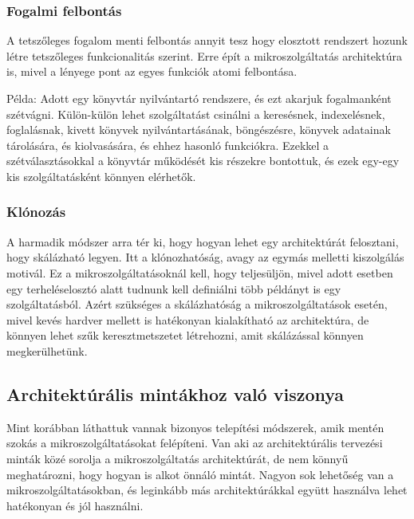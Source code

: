 \documentclass[11pt,magyar,a4paper,twoside,]{report}
\begin{document}
\subsubsection{Fogalmi felbontás}\label{fogalmi-felbontuxe1s}

A tetszőleges fogalom menti felbontás annyit tesz hogy elosztott
rendszert hozunk létre tetszőleges funkcionalitás szerint. Erre épít a
mikroszolgáltatás architektúra is, mivel a lényege pont az egyes
funkciók atomi felbontása.

Példa: Adott egy könyvtár nyilvántartó rendszere, és ezt akarjuk
fogalmanként szétvágni. Külön-külön lehet szolgáltatást csinálni a
keresésnek, indexelésnek, foglalásnak, kivett könyvek nyilvántartásának,
böngészésre, könyvek adatainak tárolására, és kiolvasására, és ehhez
hasonló funkciókra. Ezekkel a szétválasztásokkal a könyvtár működését
kis részekre bontottuk, és ezek egy-egy kis szolgáltatásként könnyen
elérhetők.

\subsubsection{Klónozás}\label{kluxf3nozuxe1s}

A harmadik módszer arra tér ki, hogy hogyan lehet egy architektúrát
felosztani, hogy skálázható legyen. Itt a klónozhatóság, avagy az egymás
melletti kiszolgálás motivál. Ez a mikroszolgáltatásoknál kell, hogy
teljesüljön, mivel adott esetben egy terheléselosztó alatt tudnunk kell
definiálni több példányt is egy szolgáltatásból. Azért szükséges a
skálázhatóság a mikroszolgáltatások esetén, mivel kevés hardver mellett
is hatékonyan kialakítható az architektúra, de könnyen lehet szűk
keresztmetszetet létrehozni, amit skálázással könnyen megkerülhetünk.

\subsection{Architektúrális mintákhoz való
viszonya}\label{architektuxfaruxe1lis-mintuxe1khoz-valuxf3-viszonya}

Mint korábban láthattuk vannak bizonyos telepítési módszerek, amik
mentén szokás a mikroszolgáltatásokat felépíteni. Van aki az
architektúrális tervezési minták közé sorolja a mikroszolgáltatás
architektúrát, de nem könnyű meghatározni, hogy hogyan is alkot önnáló
mintát. Nagyon sok lehetőség van a mikroszolgáltatásokban, és leginkább
más architektúrákkal együtt használva lehet hatékonyan és jól használni.
\end{document}
